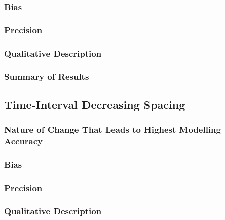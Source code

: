 \documentclass[
12pt, %
twoside,
english]{guelphthesis}
\begin{document}
\hypertarget{bias-time-inc-exp1}{%
\subsubsection{Bias}\label{bias-time-inc-exp1}}

\hypertarget{precision-time-inc-exp1}{%
\subsubsection{Precision}\label{precision-time-inc-exp1}}

\hypertarget{qualitative-time-inc-exp1}{%
\subsubsection{Qualitative Description}\label{qualitative-time-inc-exp1}}

\hypertarget{summary-of-results-1}{%
\subsubsection{Summary of Results}\label{summary-of-results-1}}

\hypertarget{time-interval-decreasing-spacing}{%
\subsection{Time-Interval Decreasing Spacing}\label{time-interval-decreasing-spacing}}

\hypertarget{nature-change-time-dec-exp1}{%
\subsubsection{Nature of Change That Leads to Highest Modelling Accuracy}\label{nature-change-time-dec-exp1}}

\hypertarget{bias-time-dec-exp1}{%
\subsubsection{Bias}\label{bias-time-dec-exp1}}

\hypertarget{precision-time-dec-exp1}{%
\subsubsection{Precision}\label{precision-time-dec-exp1}}

\hypertarget{qualitative-time-dec-exp1}{%
\subsubsection{Qualitative Description}\label{qualitative-time-dec-exp1}}
\end{document}
